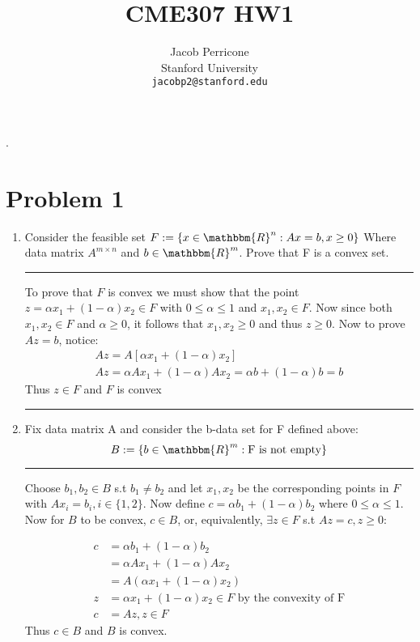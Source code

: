 \documentclass{article} %
\title{CME307 HW1}
\author{
Jacob Perricone\\
Stanford University\\
\texttt{jacobp2@stanford.edu} \\
}
\newcommand{\R}{\mathbbm{R}}
\begin{document}
    \newcommand{\argmin}{\operatornamewithlimits{argmin}}.
    \maketitle
    
    
    
 \section{Problem 1}
 \begin{enumerate}
 \item Consider the feasible set $F := \{ x \in \R^n: Ax = b, x \geq 0 \}$
 Where data matrix $A^{m \times n}$ and $b \in \R^m$. Prove that F is a convex set. 
\\ 
\rule{\textwidth}{1pt}

To prove that $F$ is convex we must show that the point $z = \alpha x_1 + (1 - \alpha)
x_2 \in F$ with $0 \leq  \alpha \leq 1$ and $x_1, x_2 \in F$.  Now since both $x_1, x_2 \in F$ and $ \alpha \geq 0$, 
it follows that $x_1, x_2 \geq 0$ and thus $z \geq 0$. Now to prove $Az = b$,  notice: 
\begin{gather*}
Az = A[ \alpha x_1 + (1 - \alpha) x_ 2] \\ 
Az = \alpha Ax_1 + (1- \alpha) A x_2  = \alpha b + (1- \alpha) b =  b
\end{gather*}
Thus $z \in F$ and $F$ is convex


\rule{\textwidth}{1pt}
\item Fix data matrix A and consider the b-data set for F defined above:
\[
B := \{ b \in \R^m: \mbox{F is not empty} \}
\]
\rule{\textwidth}{1pt}

Choose $b_1, b_2 \in B$ s.t $b_1 \neq b_2$ and let $x_1, x_2$ be the corresponding points in $F$ with $Ax_i = b_i, i \in \{1, 2\}$. Now define $c = \alpha b_1 + (1 - \alpha) b_2$ where $0 \leq \alpha \leq 1$. Now for $B$ to be convex, $c \in B$, or, equivalently,  $\exists  z \in F$ s.t  $Az = c, z \geq 0$:

\begin{equation*}
\begin{aligned}
c &= \alpha b_1 + (1 - \alpha) b_2  \\ 
&= \alpha A x_1 + (1 - \alpha) A x_2  \\
&= A( \alpha x_1 + (1 - \alpha)x_2) \\ 
z &=  \alpha x_1 + (1 - \alpha)x_2 \in F \mbox{ by the convexity of F} \\ 
c &= Az, z \in F
\end{aligned}
\end{equation*}
Thus $ c \in B$ and $B$ is convex. 


\end{enumerate}
\end{document}
